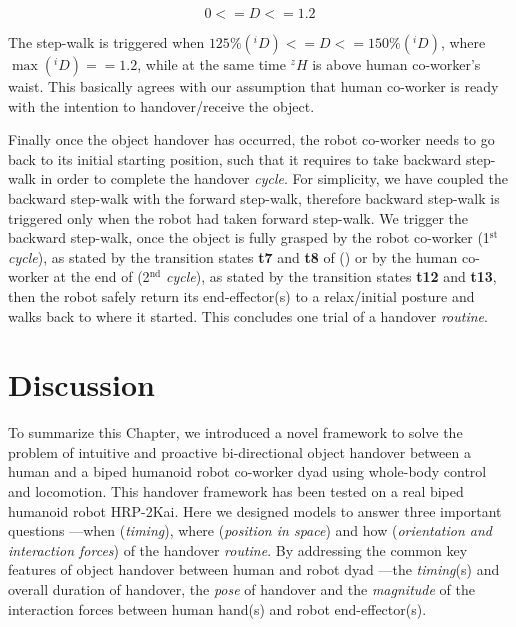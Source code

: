 \begin{equation}\label{D_range}
0 <= D <= 1.2
\end{equation}


The step-walk is triggered when $ 125\%({}^{i}D) <= D <= 150\%({}^{i}D) $, where $ \max({}^{i}D)  == 1.2 $, while at the same time $ {}^{z}H $ is above human co-worker's waist. This basically agrees with our assumption that human co-worker is ready with the intention to handover/receive the object.

Finally once the object handover has occurred, the robot co-worker needs to go back to its initial starting position, such that it requires to take backward step-walk in order to complete the handover \textit{cycle}. For simplicity, we have coupled the backward step-walk with the forward step-walk, therefore backward step-walk is triggered only when the robot had taken forward step-walk. We trigger the backward step-walk, once the object is fully grasped by the robot co-worker (1$ {}^\text{st} $ \textit{cycle}), as stated by the transition states \textbf{t7} and \textbf{t8} of () or by the human co-worker at the end of (2$ {}^\text{nd} $ \textit{cycle}), as stated by the transition states \textbf{t12} and \textbf{t13}, then the robot safely return its end-effector(s) to a relax/initial posture and walks back to where it started. This concludes one trial of a handover \textit{routine}.






\section{Discussion}

To summarize this Chapter, we introduced a novel framework to solve the problem of intuitive and proactive bi-directional object handover between a human and a biped humanoid robot co-worker dyad using whole-body control and locomotion. This handover framework has been tested on a real biped humanoid robot HRP-2Kai. Here we designed models to answer three important questions ---when (\textit{timing}), where (\textit{position in space}) and how (\textit{orientation and interaction forces}) of the handover \textit{routine}. By addressing the common key features of object handover between human and robot dyad ---the \textit{timing}(s) and overall duration of handover, the \textit{pose} of handover and the \textit{magnitude} of the interaction forces between human hand(s) and robot end-effector(s).


